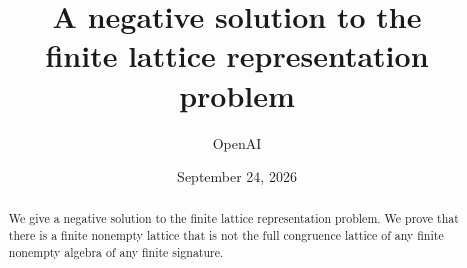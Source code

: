 \documentclass[11pt]{article}
\title{A negative solution to the\\finite lattice representation problem}
\author{OpenAI}
\date{September 24, 2026}
\begin{document}
\maketitle
\begin{abstract}
We give a negative solution to the finite lattice representation problem.
We prove that there is a finite nonempty lattice that is not the full
congruence lattice of any finite nonempty algebra of any finite signature.
\end{abstract}
\tableofcontents














\end{document}
